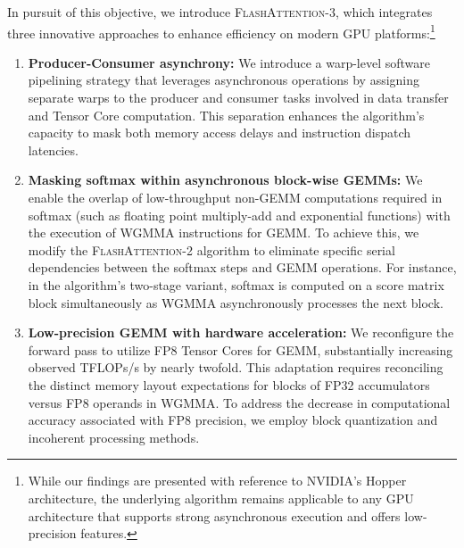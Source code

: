 In pursuit of this objective, we introduce \textsc{FlashAttention-3}, which integrates three innovative approaches to enhance efficiency on modern GPU platforms:\footnote{While our findings are presented with reference to NVIDIA's Hopper architecture, the underlying algorithm remains applicable to any GPU architecture that supports strong asynchronous execution and offers low-precision features.}

\begin{enumerate}

\item \textbf{Producer-Consumer asynchrony:} We introduce a warp-level software pipelining strategy that leverages asynchronous operations by assigning separate warps to the producer and consumer tasks involved in data transfer and Tensor Core computation. This separation enhances the algorithm’s capacity to mask both memory access delays and instruction dispatch latencies.

\item \textbf{Masking softmax within asynchronous block-wise GEMMs:} We enable the overlap of low-throughput non-GEMM computations required in softmax (such as floating point multiply-add and exponential functions) with the execution of WGMMA instructions for GEMM. To achieve this, we modify the \textsc{FlashAttention-2} algorithm to eliminate specific serial dependencies between the softmax steps and GEMM operations. For instance, in the algorithm’s two-stage variant, softmax is computed on a score matrix block simultaneously as WGMMA asynchronously processes the next block.

\item \textbf{Low-precision GEMM with hardware acceleration:} We reconfigure the forward pass to utilize FP8 Tensor Cores for GEMM, substantially increasing observed TFLOPs/s by nearly twofold. This adaptation requires reconciling the distinct memory layout expectations for blocks of FP32 accumulators versus FP8 operands in WGMMA. To address the decrease in computational accuracy associated with FP8 precision, we employ block quantization and incoherent processing methods.
\end{enumerate}

